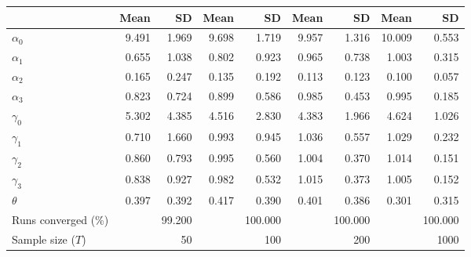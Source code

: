 
\begin{tabular}[t]{lrrrrrrrr}
\toprule
  & Mean & SD & Mean  & SD  & Mean   & SD   & Mean    & SD   \\
\midrule
$\alpha_{0}$ & 9.491 & 1.969 & 9.698 & 1.719 & 9.957 & 1.316 & 10.009 & 0.553\\
$\alpha_{1}$ & 0.655 & 1.038 & 0.802 & 0.923 & 0.965 & 0.738 & 1.003 & 0.315\\
$\alpha_{2}$ & 0.165 & 0.247 & 0.135 & 0.192 & 0.113 & 0.123 & 0.100 & 0.057\\
$\alpha_{3}$ & 0.823 & 0.724 & 0.899 & 0.586 & 0.985 & 0.453 & 0.995 & 0.185\\
$\gamma_{0}$ & 5.302 & 4.385 & 4.516 & 2.830 & 4.383 & 1.966 & 4.624 & 1.026\\
$\gamma_{1}$ & 0.710 & 1.660 & 0.993 & 0.945 & 1.036 & 0.557 & 1.029 & 0.232\\
$\gamma_{2}$ & 0.860 & 0.793 & 0.995 & 0.560 & 1.004 & 0.370 & 1.014 & 0.151\\
$\gamma_{3}$ & 0.838 & 0.927 & 0.982 & 0.532 & 1.015 & 0.373 & 1.005 & 0.152\\
$\theta$ & 0.397 & 0.392 & 0.417 & 0.390 & 0.401 & 0.386 & 0.301 & 0.315\\
Runs converged (\%) &  & 99.200 &  & 100.000 &  & 100.000 &  & 100.000\\
Sample size ($T$) &  & 50 &  & 100 &  & 200 &  & 1000\\
\bottomrule
\end{tabular}
